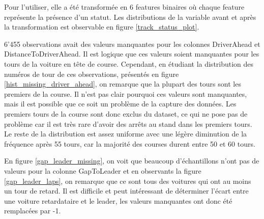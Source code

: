 Pour l'utiliser, elle a été transformée en 6 features binaires où chaque feature représente la présence d'un statut.
Les distributions de la variable avant et après la transformation est observable en figure \ref{track_status_plot}.

6'455 observations avait des valeurs manquantes pour les colonnes DriverAhead et DistanceToDriverAhead.
Il est logique que ces valeurs soient manquantes pour les tours de la voiture en tête de course.
Cependant, en étudiant la distribution des numéros de tour de ces observations,
présentés en figure \ref{hist_missing_driver_ahead}, on remarque que la plupart des tours sont les premiers de la course.
Il n'est pas clair pourquoi ces valeurs sont manquantes, mais il est possible que ce soit un problème de la capture des données.
Les premiers tours de la course sont donc exclus du dataset, ce qui ne pose pas de problème car il est très rare d'avoir des arrêts au stand dans les premiers tours.
Le reste de la distribution est assez uniforme avec une légère diminution de la fréquence après 55 tours, car la majorité des courses durent entre 50 et 60 tours.


En figure \ref{gap_leader_missing}, on voit que beaucoup d'échantillons n'ont pas de valeurs pour la colonne GapToLeader et en observants la figure \ref{gap_leader_laps}, on remarque que ce sont tous des voitures qui ont au moins un tour de retard.
Il est difficile et peut intéressant de déterminer l'écart entre une voiture retardataire et le leader, les valeurs manquantes ont donc été remplacées par -1.



